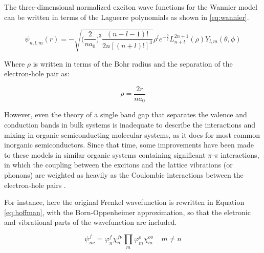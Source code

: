 The three-dimensional normalized exciton wave functions for the Wannier model can be written in terms of the Laguerre polynomials as shown in \ref{eq:wannier}\cite{Haug}.



\begin{equation}

\psi_{n,l,m} (r) = - \sqrt{\Big(\frac{2} {na_{0}}\Big)^3 \frac{(n-l-1)!} {2n[(n+l)!]^3}} \rho^l e^{-\frac{\rho}{2}}L_{n+l}^{2n+1}(\rho) Y_{l,m}(\theta,\phi)

\label{eq:wannier}

\end{equation}



Where $\rho$ is written in terms of the Bohr radius and the separation of the electron-hole pair as:



\begin{equation}

\rho = \frac{2r}{na_0}

\label{eq:rho}

\end{equation}





However, even the theory of a single band gap that separates the valence and conduction bands in bulk systems is inadequate to describe the interactions and mixing in organic semiconducting molecular systems, as it does for most common inorganic semiconductors\cite{Bardeen2014}.  Since that time, some improvements have been made to these models in similar organic systems containing significant $\pi$-$\pi$ interactions, in which the coupling between the excitons and the lattice vibrations (or phonons) are weighted as heavily as the Coulombic interactions between the electron-hole pairs \cite{Hennessy1999} \cite{Hoffman2000} \cite{Gisslen2009}. 



For instance, here the original Frenkel wavefunction is rewritten in Equation \ref{eq:hoffman}, with the Born-Oppenheimer approximation, so that the eletronic and vibrational parts of the wavefunction are included.



\begin{equation}

\psi_{n\nu}^f = \varphi_n^f \chi_n^{f \nu} \prod_{m} \varphi_m^o \chi_m^{oo}  \; \; \; \;  m\neq n      

\label{eq:hoffman}

\end{equation}



